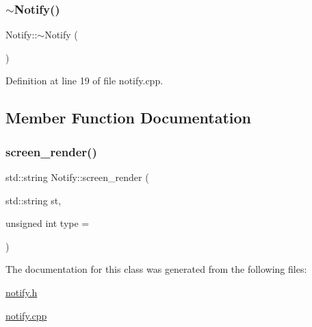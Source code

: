 \subsubsection{\texorpdfstring{$\sim$\+Notify()}{~Notify()}}
{\footnotesize\ttfamily Notify\+::$\sim$\+Notify (\begin{DoxyParamCaption}{ }\end{DoxyParamCaption})}



Definition at line 19 of file notify.\+cpp.



\subsection{Member Function Documentation}
\mbox{\label{class_notify_a7055e1a2409ac4f55021e171ce6942e1}} 
\subsubsection{\texorpdfstring{screen\+\_\+render()}{screen\_render()}}
{\footnotesize\ttfamily std\+::string Notify\+::screen\+\_\+render (\begin{DoxyParamCaption}\item[{std\+::string}]{st,  }\item[{unsigned int}]{type = {} }\end{DoxyParamCaption})}



The documentation for this class was generated from the following files\+:\begin{DoxyCompactItemize}
\item 
\mbox{\hyperlink{notify_8h}{notify.\+h}}\item 
\mbox{\hyperlink{notify_8cpp}{notify.\+cpp}}\end{DoxyCompactItemize}
